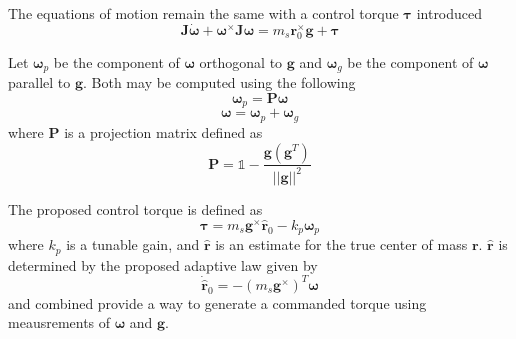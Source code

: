 The equations of motion remain the same with a control torque $\bm{\tau}$ introduced
\begin{equation} \label{equation:EomWithTau}
    \bm{J}\dot{\bm{\omega}} + \bm{\omega}^\times \bm{J\omega} 
    = m_s\bm{r}_0^{\times}\bm{g} + \bm{\tau}
\end{equation}

Let $\bm{\omega}_p$ be the component of $\bm{\omega}$ orthogonal to $\bm{g}$ and $\bm{\omega}_g$ be the component of $\bm{\omega}$ parallel to $\bm{g}$. Both may be computed using the following
\begin{equation}
    \bm{\omega}_p = \bm{P\omega}
\end{equation}
\begin{equation}
    \bm{\omega}=\bm{\omega}_p+\bm{\omega}_g
\end{equation}
where $\bm{P}$ is a projection matrix defined as
\begin{equation}
    \bm{P}=\mathbb{1}-\frac{\bm{g}(\bm{g}^T)}{||\bm{g}||^2}
\end{equation}

The proposed control torque is defined as
\begin{equation}\label{equation:proposed_adaptive}
    \bm{\tau} = m_s\bm{g}^\times\bm{\hat{r}}_0 - k_p\bm{\omega}_p
\end{equation}
where $k_p$ is a tunable gain,  and $\hat{\bm{r}}$ is an estimate for the true center of mass ${\bm{r}}$.  $\hat{\bm{r}}$ is determined by the proposed adaptive law given by
\begin{equation} \label{equation:adaptive_law}
    \dot{\hat{\bm{r}}}_0 = -(m_s\bm{g}^{\times})^T\bm{\omega}
\end{equation}
 and  combined provide a way to generate a commanded torque using meausrements of $\bm{\omega}$ and $\bm{g}$. 

